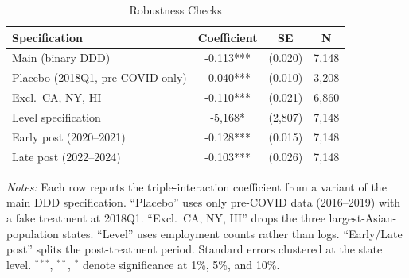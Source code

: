 \begin{table}[t]
\centering
\caption{Robustness Checks}
\label{tab:robustness}
\small
\begin{threeparttable}
\begin{tabular}{lccc}
\toprule
Specification & Coefficient & SE & N \\
\midrule
Main (binary DDD) & -0.113*** & (0.020) & 7,148 \\
Placebo (2018Q1, pre-COVID only) & -0.040*** & (0.010) & 3,208 \\
Excl.\ CA, NY, HI & -0.110*** & (0.021) & 6,860 \\
Level specification & -5,168* & (2,807) & 7,148 \\
Early post (2020--2021) & -0.128*** & (0.015) & 7,148 \\
Late post (2022--2024) & -0.103*** & (0.026) & 7,148 \\
\bottomrule
\end{tabular}
\begin{tablenotes}\small
\item \textit{Notes:} Each row reports the triple-interaction coefficient from a variant of the main DDD specification. ``Placebo'' uses only pre-COVID data (2016--2019) with a fake treatment at 2018Q1. ``Excl.\ CA, NY, HI'' drops the three largest-Asian-population states. ``Level'' uses employment counts rather than logs. ``Early/Late post'' splits the post-treatment period. Standard errors clustered at the state level. $^{***}$, $^{**}$, $^{*}$ denote significance at 1\%, 5\%, and 10\%.
\end{tablenotes}
\end{threeparttable}
\end{table}
